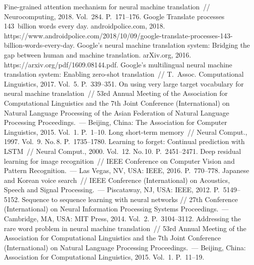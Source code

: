 \begin{multicols}{2}
{{\begin{thebibliography}{99}
 Fine-grained attention mechanism for neural 
machine translation~// Neurocomputing, 2018. Vol.~284. P.~171--176.
   Google Translate processes 143~billion words every day. 
androidpolice.com, 2018. {\sf  
https://\linebreak www.androidpolice.com/2018/10/09/google-translate-processes-143-billion-words-every-day}.
   Google's neural 
machine translation system: Bridging the gap between human and machine 
translation. arXiv.org, 2016. {\sf https://arxiv.org/pdf/1609.08144.pdf}.
   Google's multilingual 
neural machine translation system: Enabling zero-shot translation~// T.~Assoc.
 Computational Linguistics, 2017. Vol.~5. P.~339--351.
On using very large target vocabulary for neural machine translation~// 53rd Annual 
Meeting of the Association for Computational Linguistics and the 7th Joint 
Conference (International) on Natural Language Processing of the Asian Federation 
of Natural Language Processing Proceedings.~--- Beijing, China: The Association for 
Computer Linguistics, 2015. Vol.~1. P.~1--10.
   Long short-term memory~// Neural 
Comput., 1997. Vol.~9. No.\,8. P.~1735--1780.
   Learning to forget: Continual 
prediction with LSTM~// Neural Comput., 2000. Vol.~12. No.\,10.  
P.~2451--2471.
   Deep residual learning for image 
recognition~// IEEE Conference on Computer Vision and Pattern Recognition.~--- 
Las Vegas, NV, USA: IEEE, 2016. P.~770--778.
   Japanese and Korean voice search~// IEEE 
 Conference (International) on Acoustics, Speech and Signal Processing.~--- 
Piscataway, NJ, USA: IEEE, 2012. P.~5149--5152.
   Sequence to sequence learning with 
neural networks // 27th Conference (International) on Neural Information Processing 
Systems Proceedings.~--- Cambridge, MA, USA: MIT Press, 2014. Vol.~2.  
P.~3104--3112.
   Addressing 
the rare word problem in neural machine translation~// 53rd Annual Meeting of the 
Association for Computational Linguistics and the 7th Joint Conference 
(International) on Natural Language Processing Proceedings.~--- Beijing, China: 
Association for Computational Linguistics, 2015. Vol.~1. P.~11--19.
 

\end{thebibliography}}}
\end{multicols}
